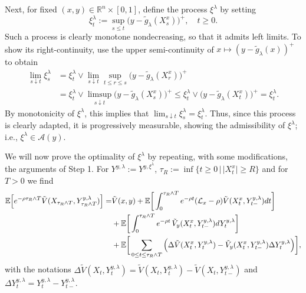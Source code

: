 \documentclass[11pt]{amsart}
\theoremstyle{plain}
\def \dd{{\rm d}}
\def \R{\mathbb{R}}
\numberwithin{equation}{section}
\begin{document}
Next, for fixed $(x,y) \in \R ^n \times [0,1]$, define the process $\xi^\lambda$ by setting
$$
\xi^\lambda_t := \sup_{s\leq t } \big( y- \tilde g_\lambda(X^x_s) \big)^+, \quad t\geq 0. 
$$
Such a process is clearly monotone nondecreasing, so that it admits left limits.
To show its right-continuity, use the upper semi-continuity of $x \mapsto (y-\tilde g_\lambda(x))^+$ to obtain
$$
\begin{aligned}
    \lim_{s \downarrow t} \xi^\lambda_s 
    & = \xi^\lambda_t \lor \lim_{s \downarrow t} \sup_{t \leq r \leq s} \big( y- \tilde g_\lambda(X^x_r) \big)^+ \\
    & = \xi^\lambda_t \lor \limsup_{s \downarrow t} \big( y- \tilde g_\lambda(X^x_s) \big)^+ \leq \xi^\lambda_t \lor \big( y- \tilde g_\lambda(X^x_t) \big)^+ = \xi^\lambda_t.
\end{aligned}
$$
By monotonicity of $\xi^\lambda$, this implies that $\lim_{s \downarrow t} \xi^\lambda_s = \xi^\lambda_t$.
Thus, since this process is clearly adapted, it is progressively measurable, showing the admissibility of $\xi^\lambda$; i.e., $\xi^\lambda \in \mathcal A (y)$.

We will now prove the optimality of $\xi^\lambda$ by repeating, with some modifications, the arguments of Step 1.
For $Y^{y,\lambda} := Y^{y,\xi^\lambda}$, $\tau_R:=\inf\{t \ge 0 \,| \,  |X^x_t| \ge R\}$ and for $T>0$ we find
\begin{equation}\label{eq Ito verification 2}
\begin{aligned}
  \mathbb{E}\Big[e^{-\rho \tau_R \wedge T } \tilde V(X_{\tau_R\wedge T},Y^{y,\lambda}_{\tau_R\wedge T})\Big] 
  =& \tilde V (x,y) 
     +\mathbb{E}\bigg[\int_0^{\tau_R\wedge T} e^{-\rho t} (\mathcal{L}_x - \rho) \tilde V (X^x_t,Y^{y,\lambda}_{t-})    \dd t \bigg] \\ 
    & + \mathbb{E}\bigg[\int_0^{\tau_R\wedge T} e^{-\rho t} \, \tilde V _y (X^x_t,Y^{y,\lambda}_{t-}) \dd Y_t^{y,\lambda} \bigg]\\
    &+\mathbb{E}\bigg[\sum_{0\leq t\leq \tau_R\wedge T} \Big( \Delta \tilde V (X^x_t,Y^{y,\lambda}_{t}) - \tilde V_y (X^x_t,Y^{y,\lambda}_{t-})\Delta Y^{y,\lambda}_t \Big)\bigg], 
\end{aligned}
\end{equation}
with the notations $\Delta \tilde V(X_t,Y^{y,\lambda}_{t}) =\tilde V(X_t,Y^{y,\lambda}_{t})-\tilde V(X_t,Y^{y,\lambda}_{t-})$ and $\Delta Y^{y,\lambda}_t =Y^{y,\lambda}_t - Y^{y,\lambda}_{t-} $.
\end{document}
